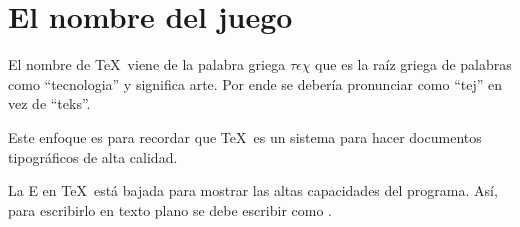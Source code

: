 \section{El nombre del juego}

El nombre de \TeX\ viene de la palabra griega $\tau\epsilon\chi$ que es la raíz griega de palabras como ``tecnologia'' y significa arte. Por ende se debería pronunciar como ``tej'' en vez de ``teks''.

Este enfoque es para recordar que \TeX\ es un sistema para hacer documentos tipográficos de alta calidad.

La E en \TeX\ está bajada para mostrar las altas capacidades del programa. Así, para escribirlo en texto plano se debe escribir como .
